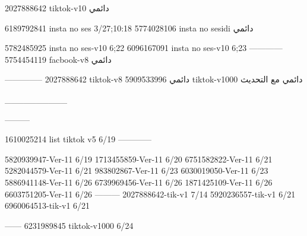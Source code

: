 2027888642 tiktok-v10
دائمي

6189792841 insta no ses
3/27;10:18
5774028106 insta no sesidi
دائمي


5782485925 insta no ses-v10
6;22
6096167091 insta no ses-v10
6;23
------------
5754454119 facbook-v8
دائمي


--------------
2027888642 tiktok-v8
دائمي
5909533996 tiktok-v1000
دائمي مع التحديث

__________

---------

1610025214 list tiktok v5
6/19
------------

5820939947-Ver-11
6/19
1713455859-Ver-11
6/20
6751582822-Ver-11
6/21
5282044579-Ver-11
6/21
983802867-Ver-11
6/23
6030019050-Ver-11
6/23
5886941148-Ver-11
6/26
6739969456-Ver-11
6/26
1871425109-Ver-11
6/26
6603751205-Ver-11
6/26
---------
2027888642-tik-v1
7/14
5920236557-tik-v1
6/21
6960064513-tik-v1
6/21

------
6231989845 tiktok-v1000
6/24
